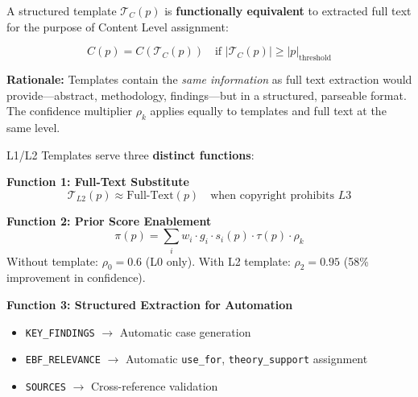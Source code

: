 \begin{tcolorbox}[colback=green!5!white, colframe=green!75!black,
    title=\textbf{Axiom TPL-1: Template Equivalence}]

A structured template $\mathcal{T}_C(p)$ is \textbf{functionally equivalent} to extracted
full text for the purpose of Content Level assignment:

\begin{equation}
C(p) = C(\mathcal{T}_C(p)) \quad \text{if } |\mathcal{T}_C(p)| \geq |p|_{\text{threshold}}
\end{equation}

\textbf{Rationale:} Templates contain the \textit{same information} as full text extraction
would provide---abstract, methodology, findings---but in a structured, parseable format.
The confidence multiplier $\rho_k$ applies equally to templates and full text at the same level.

\end{tcolorbox}

\begin{tcolorbox}[colback=green!5!white, colframe=green!75!black,
    title=\textbf{Axiom TPL-2: Template Purpose (Functional Specification)}]

L1/L2 Templates serve three \textbf{distinct functions}:

\textbf{Function 1: Full-Text Substitute}
\begin{equation}
\mathcal{T}_{L2}(p) \approx \text{Full-Text}(p) \quad \text{when copyright prohibits } L3
\end{equation}

\textbf{Function 2: Prior Score Enablement}
\begin{equation}
\pi(p) = \sum_i w_i \cdot g_i \cdot s_i(p) \cdot \tau(p) \cdot \rho_k
\end{equation}
Without template: $\rho_0 = 0.6$ (L0 only).
With L2 template: $\rho_2 = 0.95$ (58\% improvement in confidence).

\textbf{Function 3: Structured Extraction for Automation}
\begin{itemize}[nosep]
    \item \texttt{KEY\_FINDINGS} $\to$ Automatic case generation
    \item \texttt{EBF\_RELEVANCE} $\to$ Automatic \texttt{use\_for}, \texttt{theory\_support} assignment
    \item \texttt{SOURCES} $\to$ Cross-reference validation
\end{itemize}

\end{tcolorbox}

